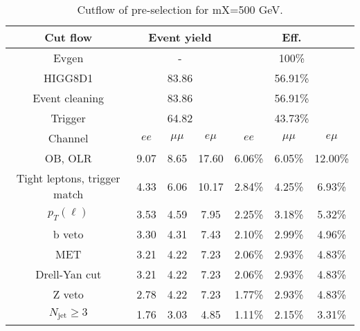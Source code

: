 \begin{table}
\centering\small
\begin{tabular}{c|ccc|ccc}
\hline
\hline
Cut flow &\multicolumn{3}{c|}{Event yield}&\multicolumn{3}{c}{Eff.}      \\
\hline
Evgen&\multicolumn{3}{c|}{-}&\multicolumn{3}{c}{100\%}\\
HIGG8D1&\multicolumn{3}{c|}{83.86}&\multicolumn{3}{c}{56.91\%}\\
Event cleaning&\multicolumn{3}{c|}{83.86}&\multicolumn{3}{c}{56.91\%}\\
Trigger&\multicolumn{3}{c|}{64.82    }&\multicolumn{3}{c}{43.73\%}\\
Channel&$ee$&$\mu\mu$&$e\mu$&$ee$&$\mu\mu$&$e\mu$\\
\hline
OB, OLR    &9.07    &8.65    &17.60& 6.06\%    &6.05\%    &12.00\%\\
Tight leptons, trigger match    &4.33    &6.06    &10.17    &2.84\%    &4.25\%    &6.93\%\\
$p_T(\ell)$    &3.53    &4.59    &7.95    &2.25\%    &3.18\%    &5.32\%\\
b veto    &3.30    &4.31    &7.43    &2.10\%    &2.99\%    &4.96\%\\
MET    &3.21    &4.22    &7.23    &2.06\%    &2.93\%    &4.83\%\\
Drell-Yan cut    &3.21    &4.22    &7.23    &2.06\%    &2.93\%    &4.83\%\\
Z veto    &2.78    &4.22    &7.23    &1.77\%    &2.93\%    &4.83\%\\
$N_{\text{jet}}\geq3$    &1.76    &3.03    &4.85    &1.11\%    &2.15\%    &3.31\%\\
\hline
\hline
\end{tabular}
\caption{Cutflow of pre-selection for mX=500 GeV.}
\label{tab:cut_flow_preselection_mX500}
\end{table}
